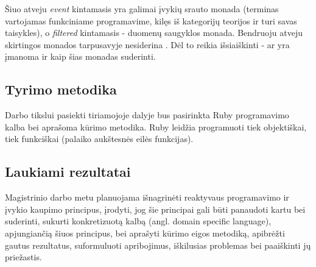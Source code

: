     Šiuo atveju \emph{event} kintamasis yra galimai įvykių srauto monada (terminas vartojamas funkciniame programavime, kilęs iš kategorijų teorijos ir turi savas taisykles), o \emph{filtered} kintamasis - duomenų saugyklos monada. Bendruoju atveju skirtingos monados tarpusavyje nesiderina \cite{DBLP:conf/fp/KingW92}. Dėl to reikia išsiaiškinti - ar yra įmanoma ir kaip šias monadas suderinti.

\subsection{Tyrimo metodika}

    Darbo tikslui pasiekti tiriamojoje dalyje bus pasirinkta Ruby programavimo kalba bei aprašoma kūrimo metodika. Ruby leidžia programuoti tiek objektiškai, tiek funkciškai (palaiko aukštesnės eilės funkcijas).

\subsection{Laukiami rezultatai}

    Magistrinio darbo metu planuojama išnagrinėti reaktyvaus programavimo ir įvykio kaupimo principus, įrodyti, jog šie principai gali būti panaudoti kartu bei suderinti, sukurti konkretizuotą kalbą (angl. domain specific language), apjungiančią šiuos principus, bei aprašyti kūrimo eigos metodiką, apibrėžti gautus rezultatus, suformuluoti apribojimus, iškilusias problemas bei paaiškinti jų priežastis.

